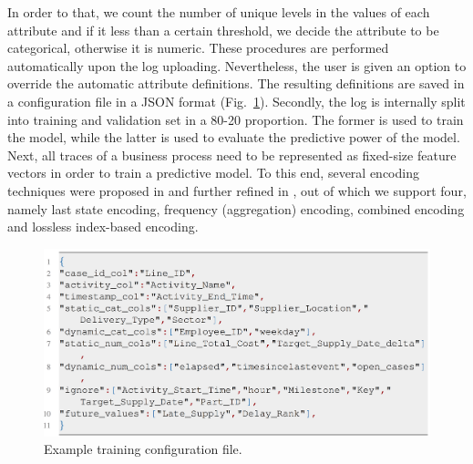 \documentclass[runningheads,a4paper]{llncs}
\begin{document}

In order to that, we count the number of unique levels in the values of each attribute and if it less than a certain threshold, we decide the attribute to be categorical, otherwise it is numeric. These procedures are performed automatically upon the log uploading. Nevertheless, the user is given an option to override the automatic attribute definitions. %
The resulting definitions are saved in a configuration file in a JSON format (Fig.~\ref{fig:listing}). Secondly, the log is internally split into training and validation set in a 80-20 proportion. The former is used to train the model, while the latter is used to evaluate the predictive power of the model. Next, all traces of a business process need to be represented as fixed-size feature vectors in order to train a predictive model. To this end, several encoding techniques were proposed in \cite{Leontjeva2015} and further refined in \cite{Teinemaa2017}, out of which we support four, namely last state encoding, frequency (aggregation) encoding, combined encoding and lossless index-based encoding. 
\begin{figure}[htp!]%
	\centering
	 \includegraphics[width=.7\textwidth]{img/Listing}
	\caption{Example training configuration file.}
	\label{fig:listing}
	\vspace{-\baselineskip}
\end{figure}
\end{document}
